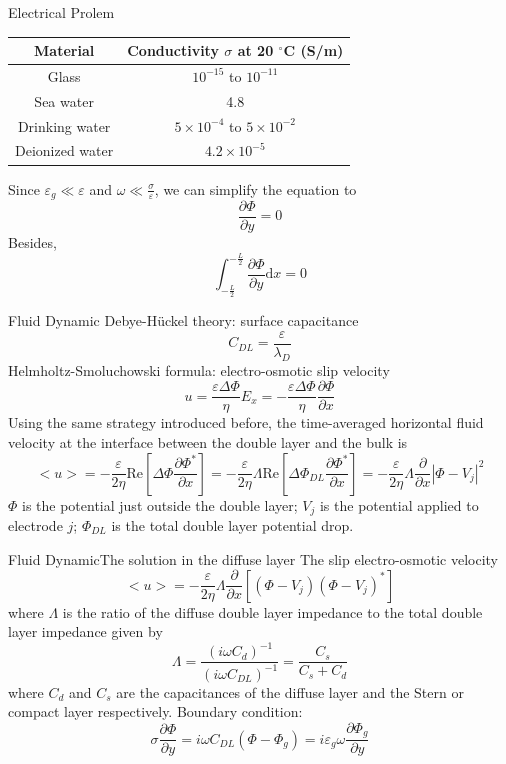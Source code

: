 \documentclass[11pt]{beamer}
\begin{document}
\begin{frame}{Electrical Prolem}
    \begin{table}[H]
        \begin{tabular}{|c|c|}
            \toprule
            Material&Conductivity $\sigma$ at 20 $^\circ$C (S/m)\\
            \midrule
            Glass&$10^{-15}$ to $10^{-11}$\\
            Sea water&4.8\\
            Drinking water&$5\times10^{-4}$ to $5\times10^{-2}$\\
            Deionized water&$4.2\times10^{-5}$\\
            \bottomrule
        \end{tabular}
    \end{table}
    Since $\varepsilon_g\ll\varepsilon$ and $\omega\ll\frac{\sigma}{\varepsilon}$, we can simplify the equation to
    \[\frac{\partial\Phi}{\partial y}=0\]
    Besides,
    \[\int_{-\frac{L}{2}}^{-\frac{L}{2}}{\frac{\partial\Phi}{\partial y}\mathrm{d}x}=0\]
\end{frame}
\begin{frame}{Fluid Dynamic}
    Debye-Hückel theory: surface capacitance
    \[C_{DL}=\frac{\varepsilon}{\lambda_D}\]
    Helmholtz-Smoluchowski formula: electro-osmotic slip velocity
    \[u=\frac{\varepsilon\Delta\Phi}{\eta}E_x=-\frac{\varepsilon\Delta\Phi}{\eta}\frac{\partial\Phi}{\partial x}\]
    Using the same strategy introduced before, the time-averaged horizontal fluid velocity at the interface between the double layer and the bulk is
    \[<u>=-\frac{\varepsilon}{2\eta}\mathrm{Re}\left[\Delta\Phi\frac{\partial\Phi^*}{\partial x}\right]=-\frac{\varepsilon}{2\eta}\Lambda\mathrm{Re}\left[\Delta\Phi_{DL}\frac{\partial\Phi^*}{\partial x}\right]=-\frac{\varepsilon}{2\eta}\Lambda\frac{\partial}{\partial x}|\Phi-V_j|^2\]
    $\Phi$ is the potential just outside the double layer; $V_j$ is the potential applied to electrode $j$; $\Phi_{DL}$ is the total double layer potential drop.
\end{frame}
\begin{frame}{Fluid Dynamic}{The solution in the diffuse layer}
    The slip electro-osmotic velocity
    \[<u>=-\frac{\varepsilon}{2\eta}\Lambda\frac{\partial}{\partial x}\left[(\Phi-V_j)(\Phi-V_j)^*\right]\]
    where $\Lambda$ is the ratio of the diffuse double layer impedance to the total double layer impedance given by
    \[\Lambda=\frac{(i\omega C_{d})^{-1}}{(i\omega C_{DL})^{-1}}=\frac{C_s}{C_s+C_d}\]
    where $C_d$ and $C_s$ are the capacitances of the diffuse layer and the Stern or compact layer respectively. Boundary condition:
    \[\sigma\frac{\partial\Phi}{\partial y}=i\omega C_{DL}(\Phi-\Phi_g)=i\varepsilon_g\omega\frac{\partial\Phi_g}{\partial y}\]
\end{frame}
\end{document}
